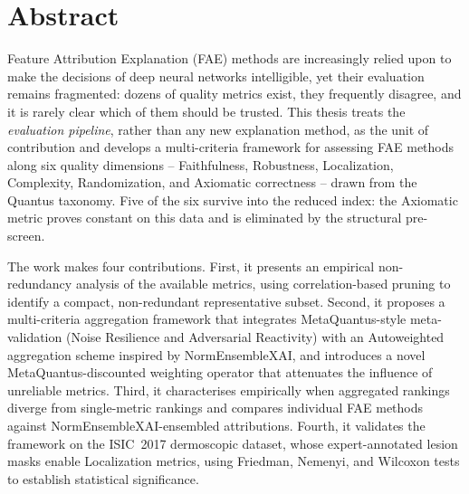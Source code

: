 \documentclass[en,11pt]{aghdpl}  %
\author{Dawid Kopeć}
\date{2026}
\begin{document}
\titlepages

\chapter*{Abstract}

Feature Attribution Explanation (FAE) methods are increasingly relied upon to
make the decisions of deep neural networks intelligible, yet their evaluation
remains fragmented: dozens of quality metrics exist, they frequently disagree,
and it is rarely clear which of them should be trusted. This thesis treats the
\emph{evaluation pipeline}, rather than any new explanation method, as the unit
of contribution and develops a multi-criteria framework for assessing FAE
methods along six quality dimensions -- Faithfulness, Robustness, Localization,
Complexity, Randomization, and Axiomatic correctness -- drawn from the Quantus
taxonomy. Five of the six survive into the reduced index: the Axiomatic
metric proves constant on this data and is eliminated by the structural
pre-screen.

The work makes four contributions. First, it presents an empirical
non-redundancy analysis of the available metrics, using correlation-based
pruning to identify a compact, non-redundant representative subset. Second, it
proposes a multi-criteria aggregation framework that integrates
MetaQuantus-style meta-validation (Noise Resilience and Adversarial Reactivity)
with an Autoweighted aggregation scheme inspired by NormEnsembleXAI, and
introduces a novel MetaQuantus-discounted weighting operator that attenuates
the influence of unreliable metrics. Third, it characterises empirically when
aggregated rankings diverge from single-metric rankings and compares individual
FAE methods against NormEnsembleXAI-ensembled attributions. Fourth, it validates
the framework on the ISIC~2017 dermoscopic dataset, whose expert-annotated
lesion masks enable Localization metrics, using Friedman, Nemenyi, and Wilcoxon
tests to establish statistical significance.
\end{document}
